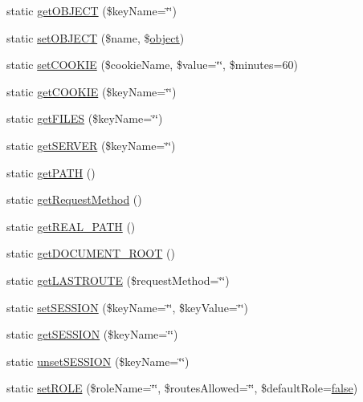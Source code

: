 \begin{DoxyCompactItemize}
\item 
static \hyperlink{classRuth_a899c68457a6a7c1b8a0b25bfd74c4c15}{get\+O\+B\+J\+E\+C\+T} (\$key\+Name=\char`\"{}\char`\"{})
\item 
static \hyperlink{classRuth_a9d554d9bdfe7596d41a2b08a3c0db9ce}{set\+O\+B\+J\+E\+C\+T} (\$name, \$\hyperlink{Shape_8php_a774642dc290de09e3aff55c8b594113f}{object})
\item 
static \hyperlink{classRuth_a971920e4c13f4e16bc8d72379804c16f}{set\+C\+O\+O\+K\+I\+E} (\$cookie\+Name, \$value=\char`\"{}\char`\"{}, \$minutes=60)
\item 
static \hyperlink{classRuth_a5ec6c65c94d056a2e0705efaa56f7660}{get\+C\+O\+O\+K\+I\+E} (\$key\+Name=\char`\"{}\char`\"{})
\item 
static \hyperlink{classRuth_a12be6f40ae06f4443848d0f8a089bd00}{get\+F\+I\+L\+E\+S} (\$key\+Name=\char`\"{}\char`\"{})
\item 
static \hyperlink{classRuth_ab868231ae3b29da9c9456d0b866dc8ec}{get\+S\+E\+R\+V\+E\+R} (\$key\+Name=\char`\"{}\char`\"{})
\item 
static \hyperlink{classRuth_abbbe520ef7554c895ab5f4213b8738a3}{get\+P\+A\+T\+H} ()
\item 
static \hyperlink{classRuth_addf8374cf72e378cb70c9cedeca62988}{get\+Request\+Method} ()
\item 
static \hyperlink{classRuth_a258953d4afe38d92f4be70313d500d40}{get\+R\+E\+A\+L\+\_\+\+P\+A\+T\+H} ()
\item 
static \hyperlink{classRuth_a0801b3a28f3385eeee817a3deb14b028}{get\+D\+O\+C\+U\+M\+E\+N\+T\+\_\+\+R\+O\+O\+T} ()
\item 
static \hyperlink{classRuth_a692691e58b9b2fce80e0bed5a3207137}{get\+L\+A\+S\+T\+R\+O\+U\+T\+E} (\$request\+Method=\char`\"{}\char`\"{})
\item 
static \hyperlink{classRuth_a4a88a74e5af0a0155eb3fe438ad995c3}{set\+S\+E\+S\+S\+I\+O\+N} (\$key\+Name=\char`\"{}\char`\"{}, \$key\+Value=\char`\"{}\char`\"{})
\item 
static \hyperlink{classRuth_a0960ac91d1a1ce9c7cb3324ee51f4d74}{get\+S\+E\+S\+S\+I\+O\+N} (\$key\+Name=\char`\"{}\char`\"{})
\item 
static \hyperlink{classRuth_a4f4e6184de654b141a679146e35f8f59}{unset\+S\+E\+S\+S\+I\+O\+N} (\$key\+Name=\char`\"{}\char`\"{})
\item 
static \hyperlink{classRuth_a169d4a654420b5abce66787cc8cb51b4}{set\+R\+O\+L\+E} (\$role\+Name=\char`\"{}\char`\"{}, \$routes\+Allowed=\char`\"{}\char`\"{}, \$default\+Role=\hyperlink{tina4_8php_aec2deb5590a84bee262c3bea206ae88f}{false})

\end{DoxyCompactItemize}
